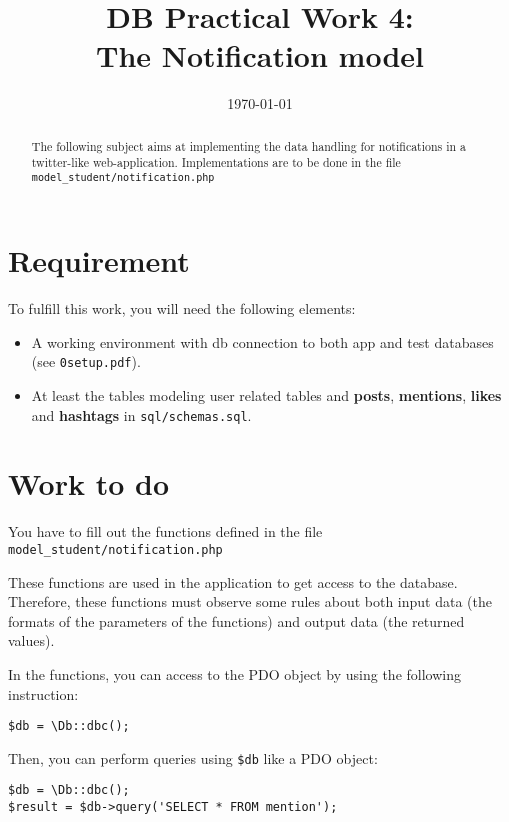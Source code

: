 \documentclass[twoside,a4paper,12pt]{article}
\title{DB Practical Work 4:\\The Notification model}
\date{\today}
\begin{document}
\maketitle

\begin{abstract}
  The following subject aims at implementing the data handling for notifications in a twitter-like web-application. Implementations are to be done in the file \texttt{model\_student/notification.php}
\end{abstract}

\tableofcontents

\clearpage

\section{Requirement}
To fulfill this work, you will need the following elements:

\begin{itemize}
\item A working environment with db connection to both app and test databases (see \texttt{0setup.pdf}).
\item At least the tables modeling user related tables and \textbf{posts}, \textbf{mentions}, \textbf{likes} and \textbf{hashtags} in \texttt{sql/schemas.sql}.
\end{itemize}

\section{Work to do}
You have to fill out the functions defined in the file \texttt{model\_student/notification.php}

These functions are used in the application to get access to the database. Therefore, these functions must observe some rules about both input data (the formats of the parameters of the functions) and output data (the returned values).

In the functions, you can access to the PDO object by using the following instruction:

\begin{lstlisting}
$db = \Db::dbc();
\end{lstlisting}

Then, you can perform queries using \texttt{\$db} like a PDO object:
\begin{lstlisting}
$db = \Db::dbc();
$result = $db->query('SELECT * FROM mention');
\end{lstlisting}
\end{document}
